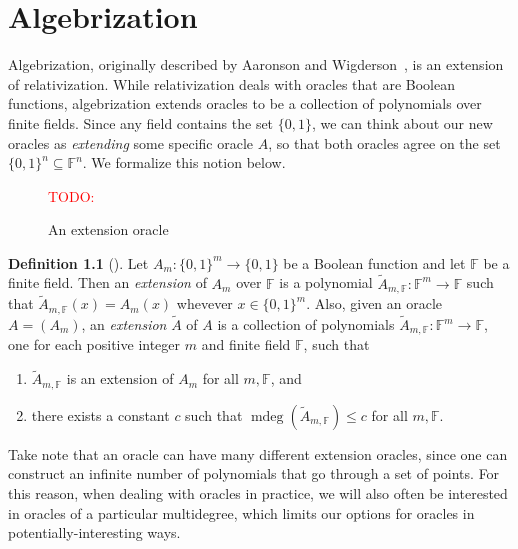 \documentclass[english,12pt]{reedthesis}
\theoremstyle{plain}
\theoremstyle{definition}
\newtheorem{defn}[defn]{Definition}
\theoremstyle{remark}
\DeclareMathOperator{\mdeg}{mdeg}
\newcommand{\TODO}[1]{\textcolor{red}{TODO: #1}}
\begin{document}
\chapter{Algebrization}\label{chap:algebrization}

Algebrization, originally described by Aaronson and Wigderson~\cite{AW09}, is an
extension of relativization. While relativization deals with oracles that are
Boolean functions, algebrization extends oracles to be a collection of
polynomials over finite fields. Since any field contains the set $\{0, 1\}$, we
can think about our new oracles as \emph{extending} some specific oracle $A$, so
that both oracles agree on the set $\{0, 1\}^{n} \subseteq \mathbb{F}^{n}$. We formalize
this notion below.

\begin{figure}[htbp]
  \TODO{}
  \caption{An extension oracle}\label{fig:ext-oracle}
\end{figure}

\begin{defn}[{\cite[Def.\ 2.2]{AW09}}]\label{def:ext-oracle}
  Let $A_{m}\colon \{0, 1\}^{m} \rightarrow \{0, 1\}$ be a Boolean function and let
  $\mathbb{F}$ be a finite field. Then an \emph{extension} of $A_{m}$ over
  $\mathbb{F}$ is a polynomial
  $\tilde{A}_{m,\mathbb{F}}\colon \mathbb{F}^{m} \rightarrow \mathbb{F}$ such that
  $\tilde{A}_{m,\mathbb{F}}(x) = A_{m}(x)$ whevever $x \in \{0, 1\}^{m}$. Also,
  given an oracle $A = (A_{m})$, an \emph{extension} $\tilde{A}$ of $A$ is a
  collection of polynomials
  $\tilde{A}_{m,\mathbb{F}}\colon \mathbb{F}^{m} \rightarrow \mathbb{F}$, one for each
  positive integer $m$ and finite field $\mathbb{F}$, such that
  \begin{enumerate}
    \item $\tilde{A}_{m,\mathbb{F}}$ is an extension of $A_{m}$ for all
          $m,\mathbb{F}$, and
    \item there exists a constant $c$ such that
          $\mdeg(\tilde{A}_{m,\mathbb{F}}) \le c$ for all $m, \mathbb{F}$.
  \end{enumerate}
\end{defn}

Take note that an oracle can have many different extension oracles, since one
can construct an infinite number of polynomials that go through a set of points.
For this reason, when dealing with oracles in practice, we will also often be
interested in oracles of a particular multidegree, which limits our options for
oracles in potentially-interesting ways.
\end{document}
